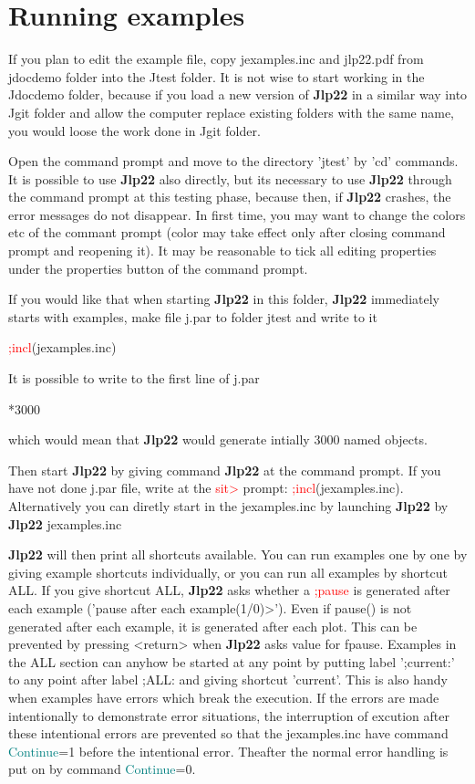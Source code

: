 \section{Running examples} 
\label{runex} 
 
If you plan to edit the example file, copy jexamples.inc and jlp22.pdf  from jdocdemo folder into the Jtest folder. 
It is not wise to start 
working in the Jdocdemo folder, because if you load a new version of \textbf{Jlp22} in a similar way into Jgit folder 
and allow the computer replace existing folders with the same name, 
you would loose the work done in Jgit folder. 
 
Open the command prompt and move to the directory 'jtest' by 'cd' commands. 
It is possible to use \textbf{Jlp22} also directly, but its necessary to use \textbf{Jlp22} through the command prompt 
at this testing phase, because then, if \textbf{Jlp22} crashes, the error messages do not disappear. 
In first time, you may want to change 
the colors etc of the commant prompt (color may take effect only after 
closing command prompt and reopening it). It may be reasonable to tick all editing 
properties under the properties button of the command prompt. 
 
If you would like that when starting \textbf{Jlp22} in this folder, \textbf{Jlp22} immediately starts with examples, 
make file j.par to folder jtest and write 
to it 
 
\textcolor{Red}{;incl}(jexamples.inc) 
 
It is possible to write to the first line of j.par 
 
*3000 
 
which would mean that \textbf{Jlp22} would generate intially 3000 named objects. 
 
 
Then start \textbf{Jlp22} by giving command \textbf{Jlp22} at the command prompt. 
If you have not done j.par file, write at the \textcolor{Red}{sit>} prompt:  \textcolor{Red}{;incl}(jexamples.inc). 
Alternatively you can diretly start in the jexamples.inc by launching \textbf{Jlp22} by\\ 
\textbf{Jlp22} jexamples.inc 
 
\textbf{Jlp22} will then print all shortcuts available. You can run examples one by one by giving example shortcuts 
individually, or you can run all examples by shortcut ALL. If you give shortcut ALL, \textbf{Jlp22} asks whether 
a \textcolor{Red}{;pause} is generated after each example ('pause after each example(1/0)>'). 
Even if \textcolor{VioletRed}{pause}() is not generated after each example, it is generated after each plot. 
This can be prevented by pressing <return> when \textbf{Jlp22} asks value for fpause. Examples in the ALL section can anyhow be started 
at any point by putting label ';current:' to any point after label ;ALL: and giving shortcut 
'current'. This is also handy when examples have errors which break the execution. If the errors are made 
intentionally to demonstrate error situations, the interruption of excution after these intentional errors are 
prevented so that the jexamples.inc have command \textcolor{teal}{Continue}=1 before the intentional error. Theafter the normal 
error handling is put on by command \textcolor{teal}{Continue}=0. 
 
